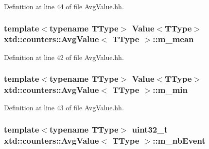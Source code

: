 Definition at line 44 of file Avg\-Value.\-hh.

\hypertarget{classxtd_1_1counters_1_1AvgValue_afa1908ab38d3deef50e1169b1cc20f6c}{
\subsubsection[{m\-\_\-mean}]{\setlength{\rightskip}{0pt plus 5cm}template$<$typename T\-Type$>$ {\bf Value}$<$T\-Type$>$ {\bf xtd\-::counters\-::\-Avg\-Value}$<$ T\-Type $>$\-::m\-\_\-mean\hspace{0.3cm}{\ttfamily [protected]}}}\label{classxtd_1_1counters_1_1AvgValue_afa1908ab38d3deef50e1169b1cc20f6c}


Definition at line 42 of file Avg\-Value.\-hh.

\hypertarget{classxtd_1_1counters_1_1AvgValue_a8e217891d937894812b5edfcf6a5ce0e}{
\subsubsection[{m\-\_\-min}]{\setlength{\rightskip}{0pt plus 5cm}template$<$typename T\-Type$>$ {\bf Value}$<$T\-Type$>$ {\bf xtd\-::counters\-::\-Avg\-Value}$<$ T\-Type $>$\-::m\-\_\-min\hspace{0.3cm}{\ttfamily [protected]}}}\label{classxtd_1_1counters_1_1AvgValue_a8e217891d937894812b5edfcf6a5ce0e}


Definition at line 43 of file Avg\-Value.\-hh.

\hypertarget{classxtd_1_1counters_1_1AvgValue_aba4c4022706bda9bfdedea3cb9c3647a}{
\subsubsection[{m\-\_\-nb\-Event}]{\setlength{\rightskip}{0pt plus 5cm}template$<$typename T\-Type$>$ uint32\-\_\-t {\bf xtd\-::counters\-::\-Avg\-Value}$<$ T\-Type $>$\-::m\-\_\-nb\-Event\hspace{0.3cm}{\ttfamily [protected]}}}\label{classxtd_1_1counters_1_1AvgValue_aba4c4022706bda9bfdedea3cb9c3647a}


